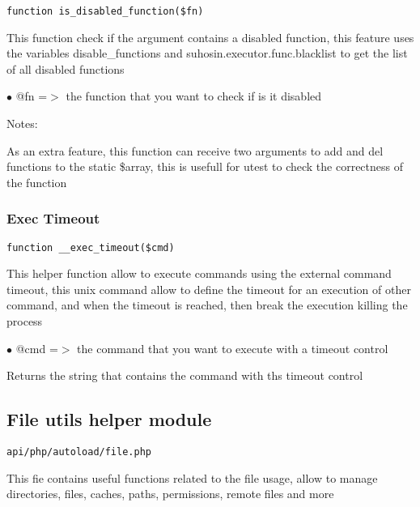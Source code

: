 \documentclass[a4paper]{article}
\begin{document}
\begin{lstlisting}
function is_disabled_function($fn)
\end{lstlisting}

This function check if the argument contains a disabled
function, this feature uses the variables disable\_functions
and suhosin.executor.func.blacklist to get the list of all
disabled functions

\begin{compactitem}
\item[\color{myblue}$\bullet$] @fn =$>$ the function that you want to check if is it disabled
\end{compactitem}

Notes:

As an extra feature, this function can receive two arguments
to add and del functions to the static \$array, this is usefull
for utest to check the correctness of the function

\hypertarget{toc126}{}
\subsubsection{Exec Timeout}

\begin{lstlisting}
function __exec_timeout($cmd)
\end{lstlisting}

This helper function allow to execute commands using the external
command timeout, this unix command allow to define the timeout for
an execution of other command, and when the timeout is reached, then
break the execution killing the process

\begin{compactitem}
\item[\color{myblue}$\bullet$] @cmd =$>$ the command that you want to execute with a timeout control
\end{compactitem}

Returns the string that contains the command with ths timeout control

\hypertarget{toc127}{}
\subsection{File utils helper module}

\begin{lstlisting}
api/php/autoload/file.php
\end{lstlisting}

This fie contains useful functions related to the file usage, allow to manage directories, files,
caches, paths, permissions, remote files and more
\end{document}
